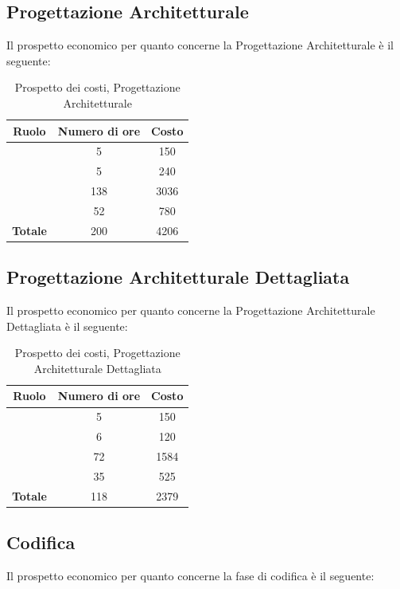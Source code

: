 \subsection{Progettazione Architetturale}
Il prospetto economico per quanto concerne la Progettazione Architetturale è il seguente:


\begin{table}[H]
	\begin{center}
		\begin{tabular}{|c|c|c|}
			\hline
			\textbf{Ruolo}	& \textbf{Numero di ore} & \textbf{Costo} \\
			\hline
			\Res	&	5  &	150	\\
			\hline
			\Amm	&	5  &	240	\\
			\hline
			\Prog	&	138  &	3036	\\
			\hline
			\Ver	&	52  &	780	\\
			\hline
			\textbf{Totale}  &	200 &	4206	\\
			\hline
		\end{tabular}
	\end{center}
	\caption{Prospetto dei costi, Progettazione Architetturale }
\end{table}


\subsection{Progettazione Architetturale Dettagliata}
Il prospetto economico per quanto concerne la Progettazione Architetturale Dettagliata è il seguente:


\begin{table}[H]
	\begin{center}
		\begin{tabular}{|c|c|c|}
			\hline
			\textbf{Ruolo}	& \textbf{Numero di ore} & \textbf{Costo} \\
			\hline
			\Res	&	5  &	150	\\
			\hline
			\Amm	&	6  &	120	\\
			\hline
			\Prog	&	72  &	1584	\\
			\hline
			\Ver	&	35  &	525	\\
			\hline
			\textbf{Totale}  &	118 &	2379	\\
			\hline
		\end{tabular}
	\end{center}
	\caption{Prospetto dei costi, Progettazione Architetturale Dettagliata }
\end{table}

\subsection{Codifica}
Il prospetto economico per quanto concerne la fase di codifica è il seguente:



